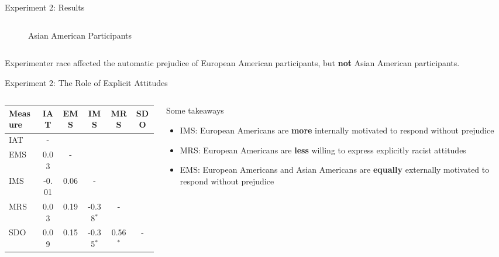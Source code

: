\begin{frame}{Experiment 2: Results}
\begin{columns}
\begin{column}{0.45\textwidth}
\begin{figure}
                    {\footnotesize Asian American Participants}
                \end{figure}
            \end{column}
        \end{columns}
        \vspace*{10pt}
        {\small Experimenter race affected the automatic prejudice of European American participants, but \textcolor{lightlavender!55!white}{\textbf{not}} Asian American participants.}
    \end{frame}

    \begin{frame}{Experiment 2: The Role of Explicit Attitudes}
        \begin{columns}

            \begin{column}{0.55\textwidth}
                \begin{table}[ht]
                    \footnotesize
                    \begin{center}
                      \begin{tabular}{lccccc}
                        
                        Measure & IAT & EMS & IMS & MRS & SDO  \\
                        \hline
                        IAT & - & \\
                        EMS & 0.03 & - \\
                        IMS & -0.01 & 0.06 & -\\
                        MRS & 0.03 & 0.19 & -0.38$^*$ & - \\
                        SDO & 0.09 & 0.15 & -0.35$^*$ & 0.56$^*$ & -
                      \end{tabular}
                    \end{center}
                  \end{table}
            \end{column}
            
            \begin{column}{0.4\textwidth}
                Some takeaways
                \begin{itemize}
                    \footnotesize 
                    \item IMS: European Americans are \textcolor{lightlavender!55!white}{\textbf{more}} internally motivated to respond without prejudice 
                    \item MRS: European Americans are \textcolor{lightlavender!55!white}{\textbf{less}} willing to express explicitly racist attitudes 
                    \item EMS: European Americans and Asian Americans are \textcolor{lightlavender!55!white}{\textbf{equally}} externally motivated to respond without prejudice
                \end{itemize}
            \end{column}
        \end{columns}
    \end{frame}

